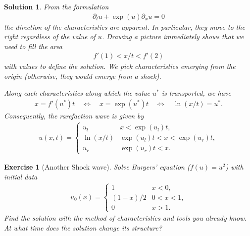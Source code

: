 \documentclass[10pt,letterpaper]{article}
\theoremstyle{break}
\newtheorem{exercise}{Exercise}
\newtheorem{solution}{Solution}
\begin{document}
\begin{solution}
    From the formulation 
    \begin{align}
     \partial_t u + \exp(u) \partial_x u = 0
    \end{align}
    the direction of the characteristics are apparent. 
    In particular, they move to the right regardless of the value of $u$. 
    Drawing a picture immediately shows that we need to fill the area 
    \begin{align}
     f'(1) < x/t < f'(2)
    \end{align}
    with values to define the solution. 
    We pick characteristics emerging from the origin (otherwise, they would emerge from a shock).
    
    Along each characteristics along which the value $u^{\ast}$ is transported, we have 
    \begin{align}
     x = f'(u^{\ast}) t
     \quad\Longleftrightarrow\quad
     x = \exp(u^{\ast}) t
     \quad\Longleftrightarrow\quad
     \ln(x/t) = u^{\ast}
     .
    \end{align}
    Consequently, the rarefaction wave is given by 
    \begin{align}
     u(x,t)
     = 
     \left\{
     \begin{array}{ll}
        u_l & x < \exp(u_l) t,
        \\
        \ln(x/t) & \exp(u_l)t < x < \exp(u_r)t,
        \\
        u_r & \exp(u_r)t < x.
     \end{array}
     \right.
    \end{align}
\end{solution}






\begin{exercise}[Another Shock wave]
    Solve Burgers' equation ($f(u)=u^2$) with initial data 
    \begin{align}
     u_{0}(x)
     = 
     \left\{
     \begin{array}{cc}
        1 & x < 0,
        \\
        (1-x)/2 & 0 < x < 1,
        \\
        0 & x > 1.
     \end{array}
     \right.
    \end{align}
    Find the solution with the method of characteristics and tools you already know.
    At what time does the solution change its structure? 
\end{exercise}
\end{document}
